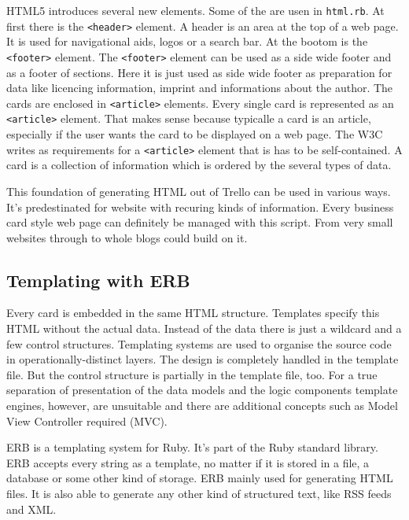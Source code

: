 HTML5 introduces several new elements. Some of the are usen in \texttt{html.rb}. At first there is the \lstinline{<header>} element. A header is an area at the top of a web page. It is used for navigational aids, logos or a search bar. \cite{html5:header} At the bootom is the \lstinline{<footer>} element. The \lstinline{<footer>} element can be used as a side wide footer and as a footer of sections. \cite{html5:footer} Here it is just used as side wide footer as preparation for data like licencing information, imprint and informations about the author. The cards are enclosed in \lstinline{<article>} elements. Every single card is represented as an \lstinline{<article>} element. That makes sense because typicalle a card is an article, especially if the user wants the card to be displayed on a web page. The W3C writes as requirements for a \lstinline{<article>} element that is has to be self-contained. \cite{html5:article} A card is a collection of information which is ordered by the several types of data. 

This foundation of generating HTML out of Trello can be used in various ways. It's predestinated for website with recuring kinds of information. Every business card style web page can definitely be managed with this script. From very small websites through to whole blogs could build on it.

\subsection{Templating with ERB}
Every card is embedded in the same HTML structure. Templates specify this HTML without the actual data. Instead of the data there is just a wildcard and a few control structures. Templating systems are used to organise the source code in operationally-distinct layers. The design is completely handled in the template file. But the control structure is partially in the template file, too. For a true separation of presentation of the data models and the logic components template engines, however, are unsuitable and there are additional concepts such as Model View Controller required (MVC).

ERB is a templating system for Ruby. It's part of the Ruby standard library. ERB accepts every string as a template, no matter if it is stored in a file, a database or some other kind of storage. ERB mainly used for generating HTML files. It is also able to generate any other kind of structured text, like RSS feeds and XML. \cite{erb:introduction} \cite{erb:docu}

